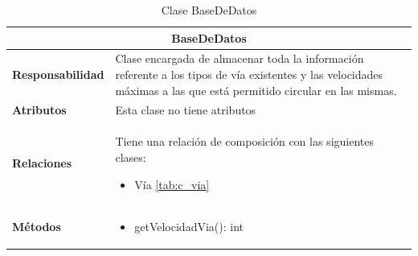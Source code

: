 \begin{table}[H]
\begin{center}
\begin{tabular}{p{} p{11cm}}
\multicolumn{2}{c}{\textbf{BaseDeDatos} } \\ \hline \hline
\textbf{Responsabilidad} &  Clase encargada de almacenar toda la información referente a los tipos de vía existentes y las velocidades máximas a las que está permitido circular en las mismas.   \\ \hline
\textbf{Atributos} & Esta clase no tiene atributos\\ \hline
\textbf{Relaciones} & \par Tiene una relación de composición con las siguientes clases:
                      \begin{itemize}
                        \item Vía \ref{tab:c_via}
                      \end{itemize}



                      \\ \hline

\textbf{Métodos} &  \begin{itemize}
                      \item getVelocidadVia(): int
                      \end{itemize}\\ \hline
\end{tabular}
\caption{Clase BaseDeDatos}
\label{tab:c_bbdd}
\end{center}
\end{table}









